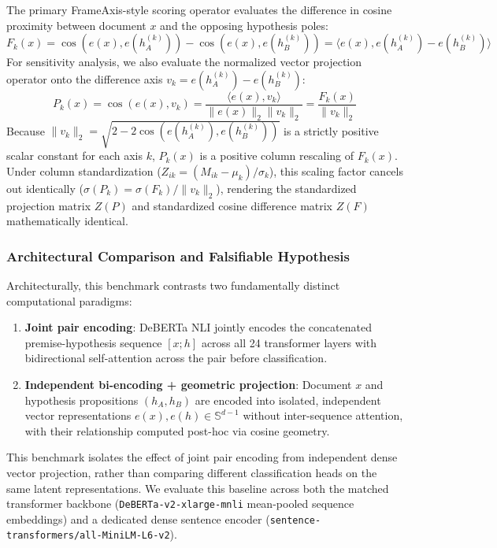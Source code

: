 The primary FrameAxis-style scoring operator evaluates the difference in cosine proximity between document $x$ and the opposing hypothesis poles:
\begin{equation}
    F_k(x) = \cos(e(x), e(h_A^{(k)})) - \cos(e(x), e(h_B^{(k)})) = \langle e(x), e(h_A^{(k)}) - e(h_B^{(k)}) \rangle
\end{equation}
For sensitivity analysis, we also evaluate the normalized vector projection operator onto the difference axis $v_k = e(h_A^{(k)}) - e(h_B^{(k)})$:
\begin{equation}
    P_k(x) = \cos(e(x), v_k) = \frac{\langle e(x), v_k \rangle}{\|e(x)\|_2 \|v_k\|_2} = \frac{F_k(x)}{\|v_k\|_2}
\end{equation}
Because $\|v_k\|_2 = \sqrt{2 - 2\cos(e(h_A^{(k)}), e(h_B^{(k)}))}$ is a strictly positive scalar constant for each axis $k$, $P_k(x)$ is a positive column rescaling of $F_k(x)$. Under column standardization ($Z_{ik} = (M_{ik} - \mu_k) / \sigma_k$), this scaling factor cancels out identically ($\sigma(P_k) = \sigma(F_k) / \|v_k\|_2$), rendering the standardized projection matrix $Z(P)$ and standardized cosine difference matrix $Z(F)$ mathematically identical.

\subsubsection{Architectural Comparison and Falsifiable Hypothesis}

Architecturally, this benchmark contrasts two fundamentally distinct computational paradigms:
\begin{enumerate}
    \item \textbf{Joint pair encoding}: DeBERTa NLI jointly encodes the concatenated premise-hypothesis sequence $[x; h]$ across all 24 transformer layers with bidirectional self-attention across the pair before classification.
    \item \textbf{Independent bi-encoding + geometric projection}: Document $x$ and hypothesis propositions $(h_A, h_B)$ are encoded into isolated, independent vector representations $e(x), e(h) \in \mathbb{S}^{d-1}$ without inter-sequence attention, with their relationship computed post-hoc via cosine geometry.
\end{enumerate}
This benchmark isolates the effect of joint pair encoding from independent dense vector projection, rather than comparing different classification heads on the same latent representations. We evaluate this baseline across both the matched transformer backbone (\texttt{DeBERTa-v2-xlarge-mnli} mean-pooled sequence embeddings) and a dedicated dense sentence encoder (\texttt{sentence-transformers/all-MiniLM-L6-v2}).

